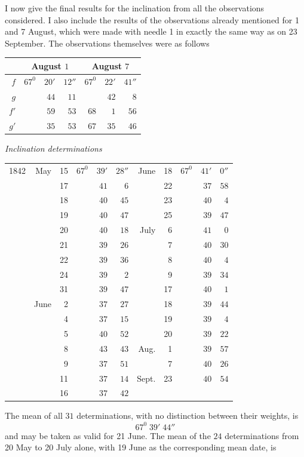 I now give the final results for the inclination from all the observations considered. I also include the results of the observations already mentioned for 1 and 7 August, which were made with needle 1 in exactly the same way as on 23 September. The observations themselves were as follows
\begin{center}
\begin{tabular}{r||rrr||rrr}
&\multicolumn{3}{c||}{August $1$}&\multicolumn{3}{c}{August $7$}\\\hline
$f$&$67^0$&$20'$&$12''$&$67^0$&$22'$&$41''$\\
$g$&&$44$&$11$&&$42$&$8$\\
$f'$&&$59$&$53$&$68$&$1$&$56$\\
$g'$&&$35$&$53$&$67$&$35$&$46$
\end{tabular}
\end{center}
\begin{center}\textit{Inclination determinations}

\begin{tabular}{rrr|rrr||rr|rrr}
1842&May&15&$67^0$&$39'$&$28''$&June&18&$67^0$&$41'$&$0''$\\
&&17&&$41$&$6$&&22&&$37$&$58$\\
&&18&&$40$&$45$&&23&&$40$&$4$\\
&&19&&$40$&$47$&&25&&$39$&$47$\\
&&20&&$40$&$18$&July&6&&$41$&$0$\\
&&21&&$39$&$26$&&7&&$40$&$30$\\
&&22&&$39$&$36$&&8&&$40$&$4$\\
&&24&&$39$&$2$&&9&&$39$&$34$\\
&&31&&$39$&$47$&&17&&$40$&$1$\\
&June&2&&$37$&$27$&&18&&$39$&$44$\\
&&4&&$37$&$15$&&19&&$39$&$4$\\
&&5&&$40$&$52$&&20&&$39$&$22$\\
&&8&&$43$&$43$&Aug.&1&&$39$&$57$\\
&&9&&$37$&$51$&&7&&$40$&$26$\\
&&11&&$37$&$14$&Sept.&23&&$40$&$54$\\
&&16&&$37$&$42$&&&&&
\end{tabular}
\end{center}
The mean of all $31$ determinations, with no distinction between their weights, is
\[
67^0\;39'\;44''
\]
and may be taken as valid for 21 June. The mean of the $24$ determinations from 20 May to 20 July alone, with 19 June as the corresponding mean date, is

